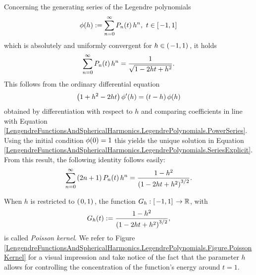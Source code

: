 Concerning the generating series of the Legendre polynomials
\begin{equation}
\label{LengendreFunctionsAndSphericalHarmonics.LegendrePolynomials.PowerSeries}
  \phi{\hspace{-0.4ex}}\left(h\right) := \sum_{n = 0}^{\infty} P_n{\hspace{-0.4ex}}\left(t\right) h^n,\ t \in
  \left[\left.-1,1\right]\right.
\end{equation}
which is absolutely and uniformly convergent for $h \in
\left(\left.-1,1\right)\right.$, it holds
\begin{equation}
  \label{LengendreFunctionsAndSphericalHarmonics.LegendrePolynomials.SeriesExpansion}
    \sum_{n = 0}^{\infty} P_n{\hspace{-0.4ex}}\left(t\right) h^n = \frac{1}{\sqrt{1-2ht+h^2}}.
\end{equation}
This follows from the ordinary differential equation
\begin{equation}
\label{LengendreFunctionsAndSphericalHarmonics.LegendrePolynomials.SeriesExplicit}
  \left(1+h^2-2ht\right)\phi'{\hspace{-0.4ex}}\left(h\right) = \left(t-h\right)\phi{\hspace{-0.4ex}}\left(h\right)
\end{equation}
obtained by differentiation with respect to $h$ and comparing coefficients in line with Equation
\eqref{LengendreFunctionsAndSphericalHarmonics.LegendrePolynomials.PowerSeries}. Using the initial 
condition $\phi{\hspace{-0.4ex}}\left(0\right)=1$ this yields the unique solution in Equation
\eqref{LengendreFunctionsAndSphericalHarmonics.LegendrePolynomials.SeriesExplicit}.
From this result, the following identity follows easily:
\begin{equation}
  \sum_{n=0}^{\infty} \left(2n+1\right) P_n{\hspace{-0.4ex}}\left(t\right) h^n =
  \frac{1-h^2}{\left(1-2ht+h^2\right)^{3/2}}.
\end{equation}

When $h$ is restricted to $\left(\left.0,1\right)\right.$, the function
$G_h:\left[\left.-1,1\right]\right. \rightarrow \mathbb{R}$, with
\begin{equation}
\label{PoissonKernel}
  G_h{\hspace{-0.4ex}}\left(t\right) := \frac{1-h^2}{\left(1-2ht+h^2\right)^{3/2}},
\end{equation}
is called \emph{Poisson kernel}. We refer 
to Figure \ref{LengendreFunctionsAndSphericalHarmonics.LegendrePolynomials.Figure.PoissonKernel}
for a visual impression and take notice of the fact that the parameter $h$
allows for controlling the concentration of the function's energy around
$t = 1$.

